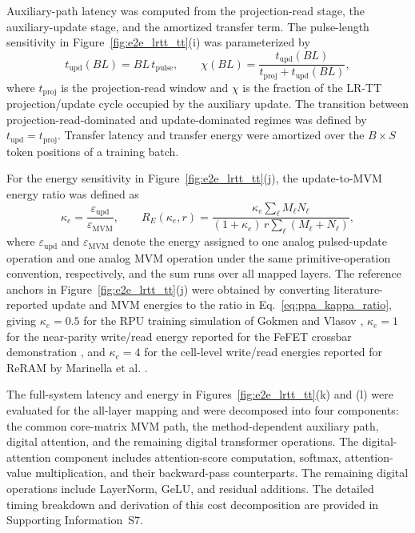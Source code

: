 \documentclass[AMA,LATO2COL]{WileyNJDv5}
\begin{document}
\noindent
Auxiliary-path latency was computed from the projection-read stage, the auxiliary-update stage, and the amortized transfer term. The pulse-length sensitivity in Figure~\ref{fig:e2e_lrtt_tt}(i) was parameterized by
\begin{equation}
t_{\mathrm{upd}}(BL)=BL\,t_{\mathrm{pulse}},
\qquad
\chi(BL)=\frac{t_{\mathrm{upd}}(BL)}
{t_{\mathrm{proj}}+t_{\mathrm{upd}}(BL)},
\label{eq:ppa_bl_latency_fraction}
\end{equation}
where \(t_{\mathrm{proj}}\) is the projection-read window and \(\chi\) is the fraction of the LR-TT projection/update cycle occupied by the auxiliary update. The transition between projection-read-dominated and update-dominated regimes was defined by \(t_{\mathrm{upd}}=t_{\mathrm{proj}}\). Transfer latency and transfer energy were amortized over the \(B\times S\) token positions of a training batch.

\noindent
For the energy sensitivity in Figure~\ref{fig:e2e_lrtt_tt}(j), the update-to-MVM energy ratio was defined as
\begin{equation}
\kappa_e=\frac{\varepsilon_{\mathrm{upd}}}{\varepsilon_{\mathrm{MVM}}},
\qquad
R_E(\kappa_e,r)=
\frac{\kappa_e\sum_{\ell}M_\ell N_\ell}
{(1+\kappa_e)\,r\sum_{\ell}(M_\ell+N_\ell)} ,
\label{eq:ppa_kappa_ratio}
\end{equation}
where \(\varepsilon_{\mathrm{upd}}\) and \(\varepsilon_{\mathrm{MVM}}\) denote the energy assigned to one analog pulsed-update operation and one analog MVM operation under the same primitive-operation convention, respectively, and the sum runs over all mapped layers. The reference anchors in Figure~\ref{fig:e2e_lrtt_tt}(j) were obtained by converting literature-reported update and MVM energies to the ratio in Eq.~\eqref{eq:ppa_kappa_ratio}, giving \(\kappa_e=0.5\) for the RPU training simulation of Gokmen and Vlasov \cite{gokmen2016rpu}, \(\kappa_e=1\) for the near-parity write/read energy reported for the FeFET crossbar demonstration \cite{soliman2023fefet_crossbar}, and \(\kappa_e=4\) for the cell-level write/read energies reported for ReRAM by Marinella et al. \cite{marinella2018rram_training}.

\noindent
The full-system latency and energy in Figures~\ref{fig:e2e_lrtt_tt}(k) and (l) were evaluated for the all-layer mapping and were decomposed into four components: the common core-matrix MVM path, the method-dependent auxiliary path, digital attention, and the remaining digital transformer operations. The digital-attention component includes attention-score computation, softmax, attention-value multiplication, and their backward-pass counterparts. The remaining digital operations include LayerNorm, GeLU, and residual additions. The detailed timing breakdown and derivation of this cost decomposition are provided in Supporting Information~S7.
\end{document}
